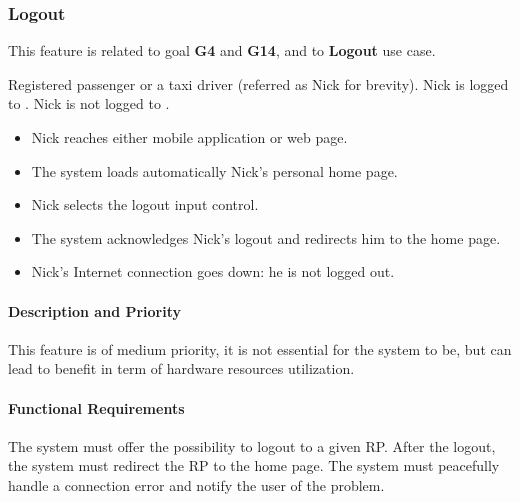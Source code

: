 \subsubsection{Logout}
This feature is related to goal \textbf{G4} and \textbf{G14}, and to \textbf{Logout} use case.
\begin{itemize}
	 Registered passenger or a taxi driver (referred as Nick for brevity).
	 Nick is logged to \myTaxiService{}.
	 Nick is not logged to \myTaxiService{}.
	\begin{itemize}
		\item Nick reaches either \myTaxiService{} mobile application or web page.
		\item The system loads automatically Nick's personal home page.
		\item Nick selects the logout input control.
		\item The system acknowledges Nick's logout and redirects him to the home page.
	\end{itemize}
	\begin{itemize}
		\item Nick's Internet connection goes down: he is not logged out.
	\end{itemize}
\end{itemize}
\paragraph{Description and Priority}
This feature is of medium priority, it is not essential for the system to be, but can lead to benefit in term of hardware resources utilization.\par
\paragraph{Functional Requirements}
\begin{itemize}
	 The system must offer the possibility to logout to a given RP.
	 After the logout, the system must redirect the RP to the \myTaxiService{} home page.
	 The system must peacefully handle a connection error and notify the user of the problem.
\end{itemize}

